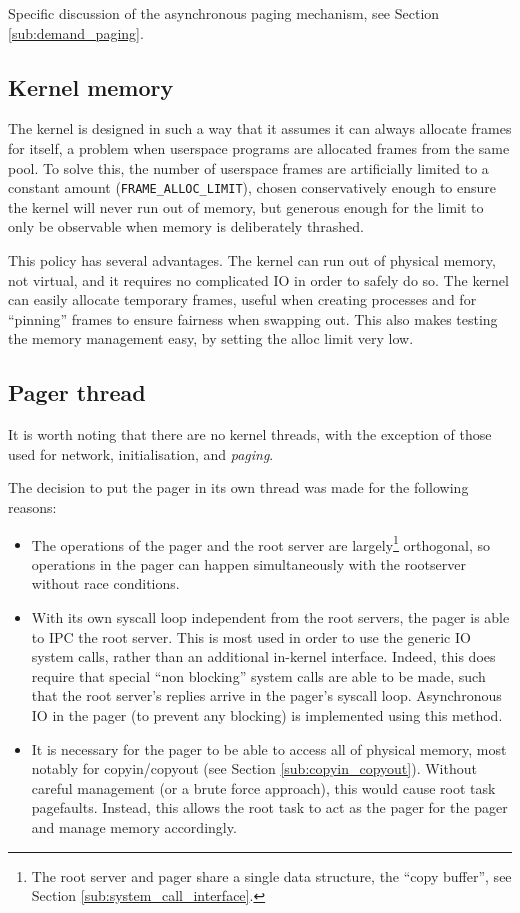 \documentclass[12pt,english]{article}
\begin{document}
Specific discussion of the asynchronous paging mechanism, see Section \ref{sub:demand_paging}.

\subsection{Kernel memory}

The kernel is designed in such a way that it assumes it can always allocate frames for itself, a problem when userspace programs are allocated frames from the same pool.  To solve this, the number of userspace frames are artificially limited to a constant amount (\texttt{FRAME\_ALLOC\_LIMIT}), chosen conservatively enough to ensure the kernel will never run out of memory, but generous enough for the limit to only be observable when memory is deliberately thrashed.

This policy has several advantages.  The kernel can run out of physical memory, not virtual, and it requires no complicated IO in order to safely do so.  The kernel can easily allocate temporary frames, useful when creating processes and for ``pinning'' frames to ensure fairness when swapping out.  This also makes testing the memory management easy, by setting the alloc limit very low.

\subsection{Pager thread}

It is worth noting that there are no kernel threads, with the exception of those used for network, initialisation, and \emph{paging}.

The decision to put the pager in its own thread was made for the following reasons:
\begin{itemize}
\item The operations of the pager and the root server are largely\footnote{The root server and pager share a single data structure, the ``copy buffer'', see Section \ref{sub:system_call_interface}.} orthogonal, so operations in the pager can happen simultaneously with the rootserver without race conditions.
\item With its own syscall loop independent from the root servers, the pager is able to IPC the root server.  This is most used in order to use the generic IO system calls, rather than an additional in-kernel interface.  Indeed, this does require that special ``non blocking'' system calls are able to be made, such that the root server's replies arrive in the pager's syscall loop.  Asynchronous IO in the pager (to prevent any blocking) is implemented using this method.
\item It is necessary for the pager to be able to access all of physical memory, most notably for copyin/copyout (see Section \ref{sub:copyin_copyout}).  Without careful management (or a brute force approach), this would cause root task pagefaults.  Instead, this allows the root task to act as the pager for the pager and manage memory accordingly.
\end{itemize}
\end{document}
